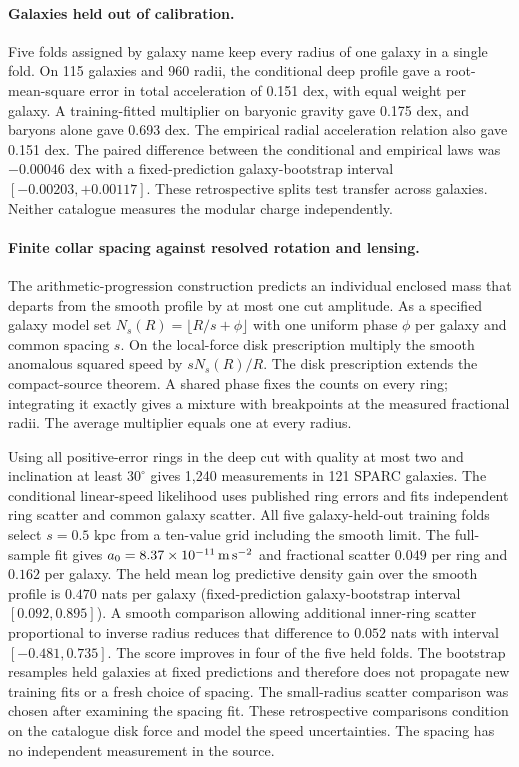 \documentclass[11pt]{article}
\begin{document}
\paragraph{Galaxies held out of calibration.}
Five folds assigned by galaxy name keep every radius of one galaxy in a
single fold. On 115 galaxies and 960 radii, the conditional deep profile
gave a root-mean-square error in total acceleration of 0.151 dex, with
equal weight per galaxy. A training-fitted multiplier on baryonic
gravity gave 0.175 dex, and baryons alone gave 0.693 dex. The empirical
radial acceleration relation also gave 0.151 dex. The paired difference
between the conditional and empirical laws was $-0.00046$ dex with a
fixed-prediction galaxy-bootstrap interval $[-0.00203,+0.00117]$.
These retrospective splits test transfer across galaxies. Neither
catalogue measures the modular charge independently.

\paragraph{Finite collar spacing against resolved rotation and lensing.}
\label{par:empirical-cut-spacing}
The arithmetic-progression construction predicts an individual enclosed
mass that departs from the smooth profile by at most one cut amplitude.
As a specified galaxy model set $N_s(R)=\lfloor R/s+\phi\rfloor$ with
one uniform phase $\phi$ per galaxy and common spacing $s$. On the
local-force disk prescription multiply the smooth anomalous squared
speed by $s N_s(R)/R$. The disk prescription extends the compact-source
theorem. A shared phase fixes the counts on every ring; integrating it
exactly gives a mixture with breakpoints at the measured fractional
radii. The average multiplier equals one at every radius.

Using all positive-error rings in the deep cut with quality at most two
and inclination at least $30^\circ$ gives 1,240 measurements in 121
SPARC galaxies. The conditional linear-speed likelihood uses published
ring errors and fits independent ring scatter and common galaxy scatter.
All five galaxy-held-out training folds select $s=0.5$ kpc from a
ten-value grid including the smooth limit. The full-sample fit gives
$a_0=8.37\times10^{-11}\,{\rm m\,s^{-2}}$ and fractional scatter
$0.049$ per ring and $0.162$ per galaxy. The held mean log predictive
density gain over the smooth profile is $0.470$ nats per galaxy
(fixed-prediction galaxy-bootstrap interval $[0.092,0.895]$).
A smooth comparison allowing additional inner-ring scatter proportional
to inverse radius reduces that difference to $0.052$ nats with interval
$[-0.481,0.735]$. The score improves in four of the five held folds. The bootstrap
resamples held galaxies at fixed predictions and therefore does not
propagate new training fits or a fresh choice of spacing. The
small-radius scatter comparison was chosen after examining the spacing
fit. These retrospective comparisons condition on the catalogue disk
force and model the speed uncertainties. The spacing has no independent
measurement in the source.
\end{document}
